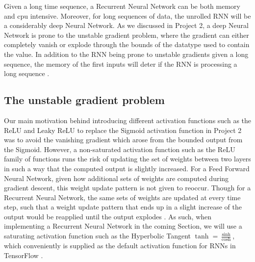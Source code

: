 \documentclass
[twocolumn,
secnumarabic,
nobibnotes,
aps,
prl,
reprint,
groupedaddress,
amsmath,
amssymb,
]{revtex4-2}
\begin{document}
Given a long time sequence, a Recurrent Neural Network can be both memory and cpu intensive. Moreover, for long sequences of data, the unrolled RNN will be a considerably deep Neural Network. As we discussed in Project 2, a deep Neural Network is prone to the unstable gradient problem, where the gradient can either completely vanish or explode through the bounds of the datatype used to contain the value. In addition to the RNN being prone to unstable gradients given a long sequence, the memory of the first inputs will deter if the RNN is processing a long sequence \cite{Geron2019}.

\subsection{The unstable gradient problem}
Our main motivation behind introducing different activation functions such as the ReLU and Leaky ReLU to replace the Sigmoid activation function in Project 2 was to avoid the vanishing gradient which arose from the bounded output from the Sigmoid. However, a non-saturated activation function such as the ReLU family of functions runs the risk of updating the set of weights between two layers in such a way that the computed output is slightly increased. For a Feed Forward Neural Network, given how additional sets of weights are computed during gradient descent, this weight update pattern is not given to reoccur. Though for a Recurrent Neural Network, the same sets of weights are updated at every time step, such that a weight update pattern that ends up in a slight increase of the output would be reapplied until the output explodes \cite{Geron2019}. As such, when implementing a Recurrent Neural Network in the coming Section, we will use a saturating activation function such as the Hyperbolic Tangent $\tanh = \frac{\sinh}{\cosh}$, which conveniently is supplied as the default activation function for RNNs in TensorFlow \cite{tensorflow2015-whitepaper}.
\end{document}
